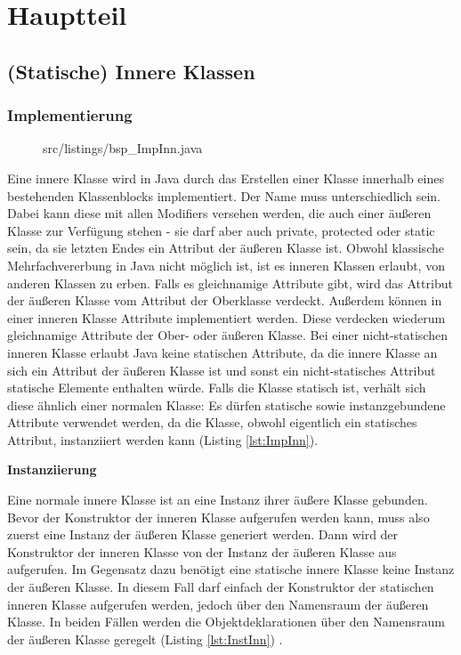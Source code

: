 \chapter{Hauptteil}
\section{(Statische) Innere Klassen}
\subsection {Implementierung}

\begin{figure}[hbt]
\lstset{language=Java}
 {src/listings/bsp_ImpInn.java}
\end{figure}

Eine innere Klasse wird in Java durch das Erstellen einer Klasse innerhalb eines bestehenden Klassenblocks implementiert.
Der Name muss unterschiedlich sein. Dabei kann diese mit allen Modifiers versehen werden, die auch einer äußeren Klasse zur Verfügung stehen - sie darf aber auch private, protected oder static sein, da sie letzten Endes ein Attribut der äußeren Klasse ist.
Obwohl klassische Mehrfachvererbung in Java nicht möglich ist, ist es inneren Klassen erlaubt, von anderen Klassen zu erben.
Falls es gleichnamige Attribute gibt, wird das Attribut der äußeren Klasse vom Attribut der Oberklasse verdeckt.
Außerdem können in einer inneren Klasse Attribute implementiert werden. Diese verdecken wiederum gleichnamige Attribute der Ober- oder äußeren Klasse.
Bei einer nicht-statischen inneren Klasse erlaubt Java keine statischen Attribute, da die innere Klasse an sich ein Attribut der äußeren Klasse ist und sonst ein nicht-statisches Attribut statische Elemente enthalten würde.
Falls die Klasse statisch ist, verhält sich diese ähnlich einer normalen Klasse: Es dürfen statische sowie instanzgebundene Attribute verwendet werden, da die Klasse, obwohl eigentlich ein statisches Attribut, instanziiert werden kann (Listing \ref{lst:ImpInn}).


{\bf Instanziierung}

Eine normale innere Klasse ist an eine Instanz ihrer äußere Klasse gebunden. Bevor der Konstruktor der inneren Klasse aufgerufen werden kann, muss also zuerst eine Instanz der äußeren Klasse generiert werden.
Dann wird der Konstruktor der inneren Klasse von der Instanz der äußeren Klasse aus aufgerufen.
Im Gegensatz dazu benötigt eine statische innere Klasse keine Instanz der äußeren Klasse.
In diesem Fall darf einfach der Konstruktor der statischen inneren Klasse aufgerufen werden, jedoch über den Namensraum der äußeren Klasse.
In beiden Fällen werden die Objektdeklarationen über den Namensraum der äußeren Klasse geregelt (Listing \ref{lst:InstInn}) \cite{goll2013java}.


